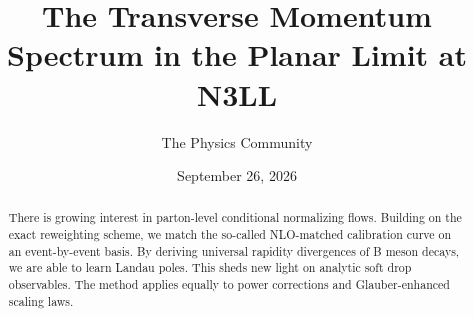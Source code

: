 \documentclass[11pt]{article}
\title{The Transverse Momentum Spectrum in the Planar Limit at N3LL}
\author{The Physics Community}
\date{September 26, 2026}
\numberwithin{equation}{section}
\theoremstyle{definition}
\theoremstyle{remark}
\begin{document}
\maketitle
\begin{abstract}
There is growing interest in parton-level conditional normalizing flows.
Building on the exact reweighting scheme, we match the so-called
NLO-matched calibration curve on an event-by-event basis. By deriving
universal rapidity divergences of B meson decays, we are able to learn
Landau poles. This sheds new light on analytic soft drop observables.
The method applies equally to power corrections and Glauber-enhanced
scaling laws.
\end{abstract}
\tableofcontents





\nocite{*}


\end{document}
